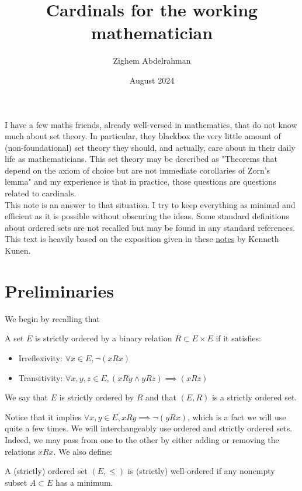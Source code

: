 \documentclass{article}
\title{Cardinals for the working mathematician}
\author{Zighem Abdelrahman}
\date{August 2024}
\begin{document}
\maketitle

I have a few maths friends, already well-versed in mathematics, that do not know much about set theory. In particular, they blackbox the very little amount of (non-foundational) set theory they should, and actually, care about in their daily life as mathematicians. This set theory may be described as "Theorems that depend on the axiom of choice but are not immediate corollaries of Zorn's lemma" and my experience is that in practice, those questions are questions related to cardinals.\\

This note is an answer to that situation. I try to keep everything as minimal and efficient as it is possible without obscuring the ideas. Some standard definitions about ordered sets are not recalled but may be found in any standard references. This text is heavily based on the exposition given in these \href{https://people.math.wisc.edu/~awmille1/old/m771-10/kunen770.pdf}{notes} by Kenneth Kunen. 

\tableofcontents
\newpage

\section{Preliminaries}

We begin by recalling that
\begin{definition}
    A set $E$ is strictly ordered by a binary relation $R \subset E \times E$ if it satisfies:
    \begin{itemize}
        \item Irreflexivity: $\forall x \in E, \lnot (xRx)$
        \item Transitivity: $\forall x, y, z \in E, (x R y \land y R z) \implies (x R z)$
    \end{itemize}
    We say that $E$ is strictly ordered by $R$ and that $(E, R)$ is a strictly ordered set.
\end{definition}
Notice that it implies $\forall x, y \in E, x R y \implies \lnot (y R x)$, which is a fact we will use quite a few times. We will interchangeably use ordered and strictly ordered sets. Indeed, we may pass from one to the other by either adding or removing the relations $xRx$. We also define:
\begin{definition}
A (strictly) ordered set $(E, \leq)$ is (strictly) well-ordered if any nonempty subset $A \subset E$ has a minimum.
\end{definition}
\end{document}
